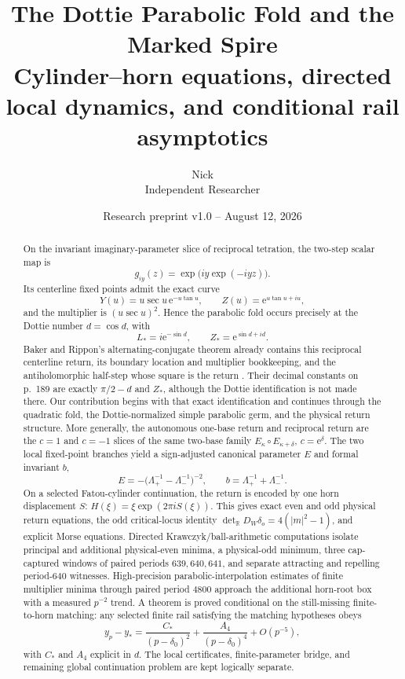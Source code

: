 \documentclass[11pt]{article}
\title{\bfseries The Dottie Parabolic Fold and the Marked Spire\\[0.35em]
\large Cylinder--horn equations, directed local dynamics, and conditional rail asymptotics}
\author{Nick\\\small Independent Researcher}
\date{Research preprint v1.0 -- August 12, 2026}
\theoremstyle{definition}
\theoremstyle{remark}
\newcommand{\R}{\mathbb R}
\newcommand{\e}{\mathrm e}
\begin{document}
\maketitle

\begin{abstract}
On the invariant imaginary-parameter slice of reciprocal tetration, the two-step scalar map is
\[
  g_{iy}(z)=\exp\!\bigl(iy\exp(-iyz)\bigr).
\]
Its centerline fixed points admit the exact curve
\[
  Y(u)=u\sec u\,\e^{-u\tan u},\qquad
  Z(u)=\e^{u\tan u+iu},
\]
and the multiplier is $(u\sec u)^2$.  Hence the parabolic fold occurs precisely at the Dottie number $d=\cos d$, with
\[
  L_*=i\e^{-\sin d},\qquad Z_*=\e^{\sin d+id}.
\]
Baker and Rippon's alternating-conjugate theorem already contains this reciprocal centerline return, its boundary location and multiplier bookkeeping, and the antiholomorphic half-step whose square is the return \citep[Theorem~8.1 and the remark on p.~200]{BakerRippon1989Composite}.  Their decimal constants on p.~189 are exactly $\pi/2-d$ and $Z_*$, although the Dottie identification is not made there.  Our contribution begins with that exact identification and continues through the quadratic fold, the Dottie-normalized simple parabolic germ, and the physical return structure.  More generally, the autonomous one-base return and reciprocal return are the $c=1$ and $c=-1$ slices of the same two-base family $E_\kappa\circ E_{\kappa+\delta}$, $c=\e^\delta$.  The two local fixed-point branches yield a sign-adjusted canonical parameter $E$ and formal invariant $b$,
\[
  E=-\bigl(\Lambda_+^{-1}-\Lambda_-^{-1}\bigr)^{-2},\qquad
  b=\Lambda_+^{-1}+\Lambda_-^{-1}.
\]
On a selected Fatou-cylinder continuation, the return is encoded by one horn displacement $S$: $H(\xi)=\xi\exp(2\pi iS(\xi))$.  This gives exact even and odd physical return equations, the odd critical-locus identity $\det_{\R}D_W\delta_o=4(|m|^2-1)$, and explicit Morse equations.  Directed Krawczyk/ball-arithmetic computations isolate principal and additional physical-even minima, a physical-odd minimum, three cap-captured windows of paired periods $639,640,641$, and separate attracting and repelling period-$640$ witnesses.  High-precision parabolic-interpolation estimates of finite multiplier minima through paired period $4800$ approach the additional horn-root box with a measured $p^{-2}$ trend.  A theorem is proved conditional on the still-missing finite-to-horn matching: any selected finite rail satisfying the matching hypotheses obeys
\[
  y_p-y_*=\frac{C_*}{(p-\delta_0)^2}+\frac{A_4}{(p-\delta_0)^4}+O(p^{-5}),
\]
with $C_*$ and $A_4$ explicit in $d$.  The local certificates, finite-parameter bridge, and remaining global continuation problem are kept logically separate.
\end{abstract}
\end{document}
